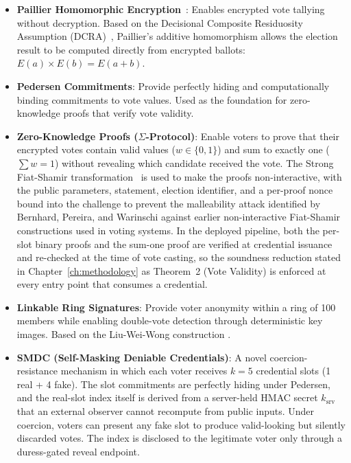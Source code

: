 \begin{itemize}
    \item \textbf{Paillier Homomorphic Encryption}~\cite{paillier1999}: Enables encrypted vote tallying without decryption. Based on the Decisional Composite Residuosity Assumption (DCRA)~\cite{paillier1999}, Paillier's additive homomorphism allows the election result to be computed directly from encrypted ballots: $E(a) \times E(b) = E(a + b)$.
    
    \item \textbf{Pedersen Commitments}: Provide perfectly hiding and computationally binding commitments to vote values. Used as the foundation for zero-knowledge proofs that verify vote validity.
    
    \item \textbf{Zero-Knowledge Proofs ($\Sigma$-Protocol)}: Enable voters to prove that their encrypted votes contain valid values ($w \in \{0, 1\}$) and sum to exactly one ($\sum w = 1$) without revealing which candidate received the vote. The Strong Fiat-Shamir transformation~\cite{bernhard2012} is used to make the proofs non-interactive, with the public parameters, statement, election identifier, and a per-proof nonce bound into the challenge to prevent the malleability attack identified by Bernhard, Pereira, and Warinschi against earlier non-interactive Fiat-Shamir constructions used in voting systems. In the deployed pipeline, both the per-slot binary proofs and the sum-one proof are verified at credential issuance and re-checked at the time of vote casting, so the soundness reduction stated in Chapter~\ref{ch:methodology} as Theorem~2 (Vote Validity) is enforced at every entry point that consumes a credential.
    
    \item \textbf{Linkable Ring Signatures}: Provide voter anonymity within a ring of 100 members while enabling double-vote detection through deterministic key images. Based on the Liu-Wei-Wong construction \cite{liu2004}.
    
    \item \textbf{SMDC (Self-Masking Deniable Credentials)}: A novel coercion-resistance mechanism in which each voter receives $k=5$ credential slots (1 real + 4 fake). The slot commitments are perfectly hiding under Pedersen, and the real-slot index itself is derived from a server-held HMAC secret $k_{\text{srv}}$ that an external observer cannot recompute from public inputs. Under coercion, voters can present any fake slot to produce valid-looking but silently discarded votes. The index is disclosed to the legitimate voter only through a duress-gated reveal endpoint.
    

\end{itemize}
